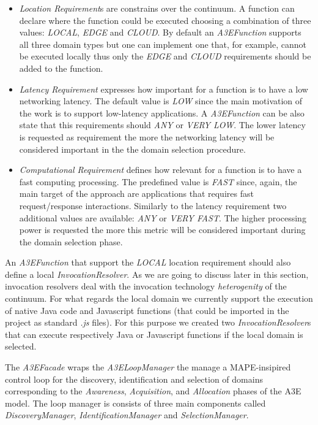\begin{itemize}
	\item \textit{Location Requirement}s are constrains over the continuum. A function can declare where the function could be executed choosing a combination of three values: \textit{LOCAL}, \textit{EDGE} and \textit{CLOUD}. By default an \textit{A3EFunction} supports all three domain types but one can implement one that, for example, cannot be executed locally thus only the \textit{EDGE} and \textit{CLOUD} requirements should be added to the function.    
	\item \textit{Latency Requirement} expresses how important for a function is to have a low networking latency. The default value is \textit{LOW} since the main motivation of the work is to support low-latency applications. A \textit{A3EFunction}  can be also state that this requirements should \textit{ANY} or \textit{VERY LOW}. The lower latency is requested as requirement the more the networking latency will be considered important in the the domain selection procedure.
	\item \textit{Computational Requirement} defines how relevant for a function is to have a fast computing processing. The predefined value is \textit{FAST} since, again, the main target of the approach are applications that requires fast request/response interactions. Similarly to the latency requirement two additional values are available:  \textit{ANY} or \textit{VERY FAST}. The higher  processing power is requested the more this metric will be considered important during the domain selection phase.
\end{itemize}

An \textit{A3EFunction} that support the \textit{LOCAL} location requirement should also define a local \textit{InvocationResolver}. As we are going to discuss later in this section, invocation resolvers deal with the invocation technology \textit{heterogenity}  of the continuum. For what regards the local domain we currently support the execution of native Java code and Javascript functions (that could be imported in the project as standard \textit{.js} files). For this purpose we created two \textit{InvocationResolver}s that can execute respectively Java or Javascript functions if the local domain is selected. 

The \textit{A3EFacade} wraps the \textit{A3ELoopManager} the manage a MAPE-insipired control loop for the discovery, identification and selection of domains corresponding to the \textit{Awareness}, \textit{Acquisition}, and \textit{Allocation} phases of the A3E model. The loop manager is consists of three main components called \textit{DiscoveryManager}, \textit{IdentificationManager} and \textit{SelectionManager}.

